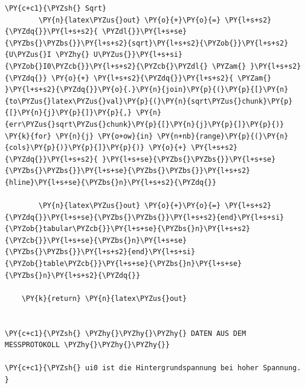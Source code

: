 \begin{tcolorbox}[breakable, size=fbox, boxrule=1pt, pad at break*=1mm,colback=cellbackground, colframe=cellborder]
\begin{Verbatim}[commandchars=\\\{\}]
        \PY{c+c1}{\PYZsh{} Sqrt}
        \PY{n}{latex\PYZus{}out} \PY{o}{+}\PY{o}{=} \PY{l+s+s2}{\PYZdq{}}\PY{l+s+s2}{ \PYZdl{}}\PY{l+s+se}{\PYZbs{}\PYZbs{}}\PY{l+s+s2}{sqrt}\PY{l+s+s2}{\PYZob{}}\PY{l+s+s2}{U\PYZus{}I \PYZhy{} U\PYZus{}}\PY{l+s+si}{\PYZob{}I0\PYZcb{}}\PY{l+s+s2}{\PYZcb{}\PYZdl{} \PYZam{} }\PY{l+s+s2}{\PYZdq{}} \PY{o}{+} \PY{l+s+s2}{\PYZdq{}}\PY{l+s+s2}{ \PYZam{} }\PY{l+s+s2}{\PYZdq{}}\PY{o}{.}\PY{n}{join}\PY{p}{(}\PY{p}{[}\PY{n}{to\PYZus{}latex\PYZus{}val}\PY{p}{(}\PY{n}{sqrt\PYZus{}chunk}\PY{p}{[}\PY{n}{j}\PY{p}{]}\PY{p}{,} \PY{n}{err\PYZus{}sqrt\PYZus{}chunk}\PY{p}{[}\PY{n}{j}\PY{p}{]}\PY{p}{)} \PY{k}{for} \PY{n}{j} \PY{o+ow}{in} \PY{n+nb}{range}\PY{p}{(}\PY{n}{cols}\PY{p}{)}\PY{p}{]}\PY{p}{)} \PY{o}{+} \PY{l+s+s2}{\PYZdq{}}\PY{l+s+s2}{ }\PY{l+s+se}{\PYZbs{}\PYZbs{}}\PY{l+s+se}{\PYZbs{}\PYZbs{}}\PY{l+s+se}{\PYZbs{}\PYZbs{}}\PY{l+s+s2}{hline}\PY{l+s+se}{\PYZbs{}n}\PY{l+s+s2}{\PYZdq{}}
        
        \PY{n}{latex\PYZus{}out} \PY{o}{+}\PY{o}{=} \PY{l+s+s2}{\PYZdq{}}\PY{l+s+se}{\PYZbs{}\PYZbs{}}\PY{l+s+s2}{end}\PY{l+s+si}{\PYZob{}tabular\PYZcb{}}\PY{l+s+se}{\PYZbs{}n}\PY{l+s+s2}{\PYZcb{}}\PY{l+s+se}{\PYZbs{}n}\PY{l+s+se}{\PYZbs{}\PYZbs{}}\PY{l+s+s2}{end}\PY{l+s+si}{\PYZob{}table\PYZcb{}}\PY{l+s+se}{\PYZbs{}n}\PY{l+s+se}{\PYZbs{}n}\PY{l+s+s2}{\PYZdq{}}
        
    \PY{k}{return} \PY{n}{latex\PYZus{}out}


\PY{c+c1}{\PYZsh{} \PYZhy{}\PYZhy{}\PYZhy{} DATEN AUS DEM MESSPROTOKOLL \PYZhy{}\PYZhy{}\PYZhy{}}

\PY{c+c1}{\PYZsh{} ui0 ist die Hintergrundspannung bei hoher Spannung. }


\end{Verbatim}
\end{tcolorbox}
